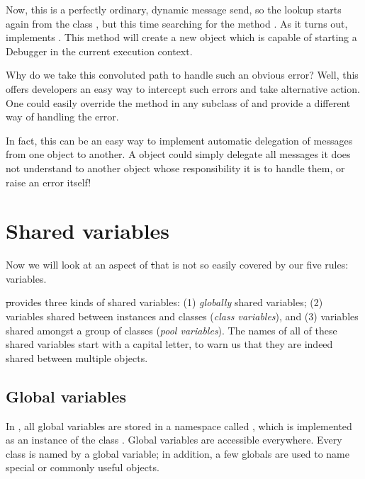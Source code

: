 \documentclass[a4paper,10pt,twoside]{book}
\begin{document}
Now, this is a perfectly ordinary, dynamic message send, so the lookup starts again from the class , but this time searching for the method .
As it turns out,  implements .
This method will create a new  object which is capable of starting a Debugger in the current execution context.

Why do we take this convoluted path to handle such an obvious error?
Well, this offers developers an easy way to intercept such errors and take alternative action.
One could easily override the method  in any subclass of  and  provide a different way of handling the error.

In fact, this can be an easy way to implement automatic delegation of messages from one object to another.
A  object could simply delegate all messages it does not understand to another object whose responsibility it is to handle them, or raise an error itself!

\section{Shared variables}

Now we will look at an aspect of \st that is not so easily covered by our five rules:  variables.

\st provides three kinds of shared variables: (1) \emph{globally} shared variables; (2) variables shared between instances and classes (\emph{class variables}), and (3) variables shared amongst a group of  classes (\emph{pool variables}).  The names of all of these shared variables start with a capital letter, to warn us that they are indeed shared between multiple objects.

\subsection{Global variables}
In \squeak, all global variables are stored in a namespace called , which is implemented as an instance of the class .
Global variables are accessible everywhere. 
Every class is named by a global variable; in addition, a few globals are used to name special or commonly useful objects.
\end{document}
